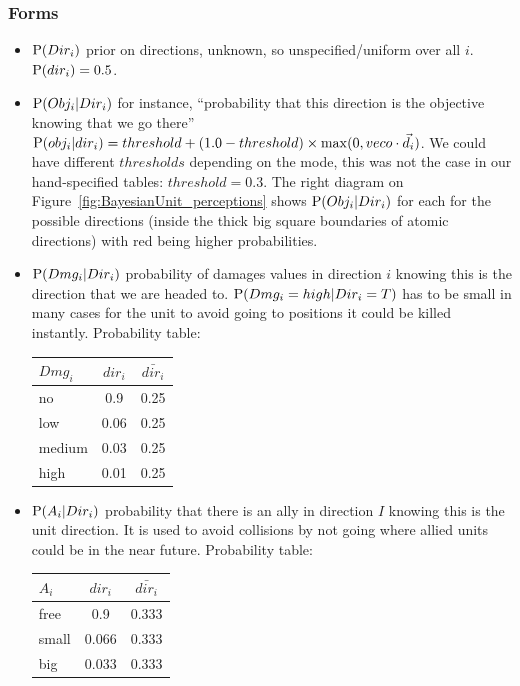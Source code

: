 \subsubsection{Forms}

\begin{itemize}
\item $\mathrm{P}(Dir_i)$ prior on directions, unknown, so unspecified/uniform over all $i$. $\mathrm{P}(dir_i) = 0.5$.

\item $\mathrm{P}(Obj_i | Dir_i)$ for instance, ``probability that this direction is the objective knowing that we go there'' $\mathrm{P}(obj_i | dir_i) = threshold + (1.0-threshold)\times \mathrm{max}(0, vec{o} \cdot \vec{d_i})$. %
We could have different $thresholds$ depending on the mode, this was not the case in our hand-specified tables: $threshold = 0.3$. The right diagram on Figure~\ref{fig:BayesianUnit_perceptions} shows $\mathrm{P}(Obj_i|Dir_i)$ for each for the possible directions (inside the thick big square boundaries of atomic directions) with red being higher probabilities.

\item $\mathrm{P}(Dmg_i | Dir_i)$ probability of damages values in direction $i$ knowing this is the direction that we are headed to. $\mathrm{P}(Dmg_i = high | Dir_i = T)$ has to be small in many cases for the unit to avoid going to positions it could be killed instantly. Probability table:\\
\begin{center}
\begin{tabular}{|l|c|c|}
\hline
$Dmg_i$ & $dir_i$ & $\bar{dir_i}$ \\
\hline
no & 0.9 & 0.25 \\
low & 0.06 & 0.25 \\
medium & 0.03 & 0.25 \\
high & 0.01 & 0.25 \\
\hline
\end{tabular}
\end{center}

\item $\mathrm{P}(A_i | Dir_i)$ probability that there is an ally in direction $I$ knowing this is the unit direction. It is used to avoid collisions by not going where allied units could be in the near future. Probability table:\\
\begin{center}
\begin{tabular}{|l|c|c|}
\hline
$A_i$ & $dir_i$ & $\bar{dir_i}$ \\
\hline
free & 0.9 & 0.333 \\
small & 0.066 & 0.333 \\
big & 0.033 & 0.333 \\
\hline
\end{tabular}
\end{center}
 


\end{itemize}
